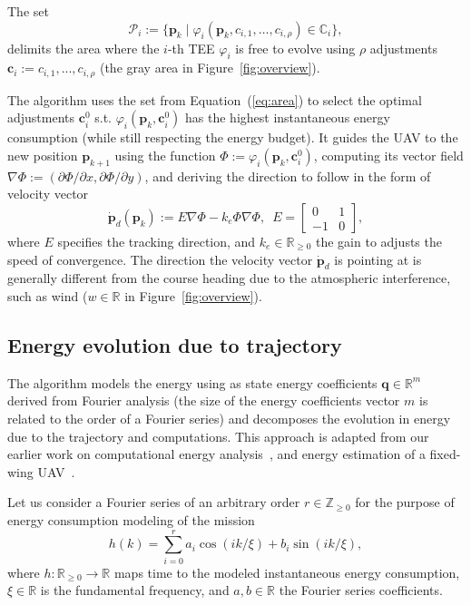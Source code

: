 \documentclass[letterpaper,10pt,conference]{ieeeconf}
\theoremstyle{definition}
\begin{document}
The set
\begin{equation}\label{eq:area}
  \mathcal{P}_i:=\{\mathbf{p}_k\mid\varphi_i(\mathbf{p}_k,c_{i,1},\dots,c_{i,\rho})\in\mathbb{C}_i\},
\end{equation}
delimits the area where the $i$-th TEE $\varphi_i$ is free to evolve using $\rho$ adjustments $\mathbf{c}_i:=c_{i,1},...,c_{i,\rho}$ (the gray area in Figure~\ref{fig:overview}).

The algorithm uses the set from Equation~(\ref{eq:area}) to select the optimal adjustments $\mathbf{c}_i^0$ s.t. $\varphi_i(\mathbf{p}_k,\mathbf{c}_i^0)$ has the highest instantaneous energy consumption (while still respecting the energy budget). It guides the UAV to the new position $\mathbf{p}_{k+1}$ using the function $\varPhi:=\varphi_i(\mathbf{p}_k,\mathbf{c}_i^0)$, computing its vector field $\nabla\varPhi:=(\partial\varPhi/\partial x,\partial\varPhi/\partial y)$, and deriving the direction to follow in the form of velocity vector
\begin{equation}\label{eq:pd}
  \dot{\mathbf{p}}_d(\mathbf{p}_k):=E\nabla\varPhi-k_e\varPhi\nabla\varPhi,\,\,\,E=\begin{bmatrix}
    0&1\\-1&0
  \end{bmatrix},
\end{equation}
where $E$ specifies the tracking direction, and $k_e\in\mathbb{R}_{\geq 0}$ the gain to adjusts the speed of convergence. The direction the velocity vector $\dot{\mathbf{p}}_d$ is pointing at is generally different from the course heading due to the atmospheric interference, such as wind ($w\in\mathbb{R}$ in Figure~\ref{fig:overview}).

\subsection{Energy evolution due to trajectory}
\label{sec:energy-model}

The algorithm models the energy using as state energy coefficients $\mathbf{q}\in\mathbb{R}^m$ derived from Fourier analysis (the size of the energy coefficients vector $m$ is related to the order of a Fourier series) and decomposes the evolution in energy due to the trajectory and computations. This approach is adapted from our earlier work on computational energy analysis~\cite{seewald2019coarse, seewald2019component}, and energy estimation of a fixed-wing UAV~\cite{seewald2020mechanical}. 

Let us consider a Fourier series of an arbitrary order $r\in\mathbb{Z}_{\geq 0}$ for the purpose of energy consumption modeling of the mission
\begin{equation}\label{eq:fourier}
  h(k)=\sum_{i=0}^{r}{a_i\cos\left({ik/\xi}\right)+b_i\sin{\left({ik/\xi}\right)}},
\end{equation}
where $h:\mathbb{R}_{\geq 0}\rightarrow\mathbb{R}$ maps time to the modeled instantaneous energy consumption, $\xi\in\mathbb{R}$ is the fundamental frequency, and $a,b\in\mathbb{R}$ the Fourier series coefficients.
\end{document}
